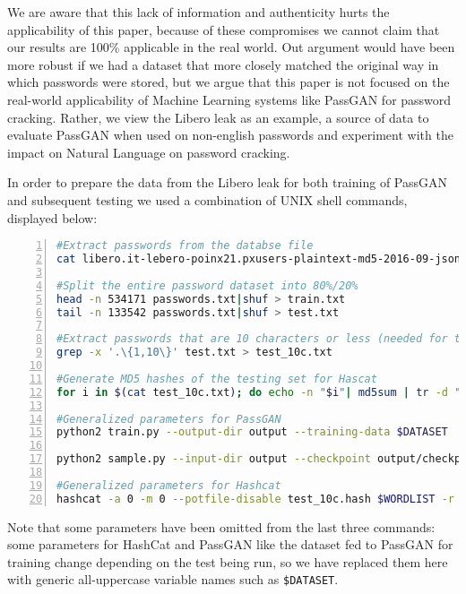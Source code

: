 We are aware that this lack of information and authenticity hurts the applicability of this paper, because of these compromises we cannot claim that our results are 100\% applicable in the real world. Out argument would have been more robust if we had a dataset that more closely matched the original way in which passwords were stored, but we argue that this paper is not focused on the real-world applicability of Machine Learning systems like PassGAN for password cracking. 
Rather, we view the Libero leak as an example, a source of data to evaluate PassGAN when used on non-english passwords and experiment with the impact on Natural Language on password cracking.

In order to prepare the data from the Libero leak for both training of PassGAN and subsequent testing we used a combination of UNIX shell commands, displayed below: 
\begin{lstlisting}[language=bash,numbers=left,stepnumber=1,breaklines=true,postbreak=\mbox{\textcolor{red}{$\hookrightarrow$}\space}]
#Extract passwords from the databse file
cat libero.it-lebero-poinx21.pxusers-plaintext-md5-2016-09-json-900k-users-extremely-private.txt|grep clearPassword |cut -d ":" -f 2 | awk '{gsub ("\"","");gsub(",","");print $1}' > passwords.txt

#Split the entire password dataset into 80%/20%
head -n 534171 passwords.txt|shuf > train.txt
tail -n 133542 passwords.txt|shuf > test.txt

#Extract passwords that are 10 characters or less (needed for testing)
grep -x '.\{1,10\}' test.txt > test_10c.txt

#Generate MD5 hashes of the testing set for Hascat
for i in $(cat test_10c.txt); do echo -n "$i"| md5sum | tr -d " -" >> test_10c.hash; done

#Generalized parameters for PassGAN
python2 train.py --output-dir output --training-data $DATASET

python2 sample.py --input-dir output --checkpoint output/checkpoints/checkpoint_95000.ckpt --output $WORDLIST -n 14344392

#Generalized parameters for Hashcat
hashcat -a 0 -m 0 --potfile-disable test_10c.hash $WORDLIST -r $RULESET -o out.txt
\end{lstlisting}
Note that some parameters have been omitted from the last three commands: some parameters for HashCat and PassGAN like the dataset fed to PassGAN for training change depending on the test being run, so we have replaced them here with generic all-uppercase variable names such as \texttt{\$DATASET}. 
